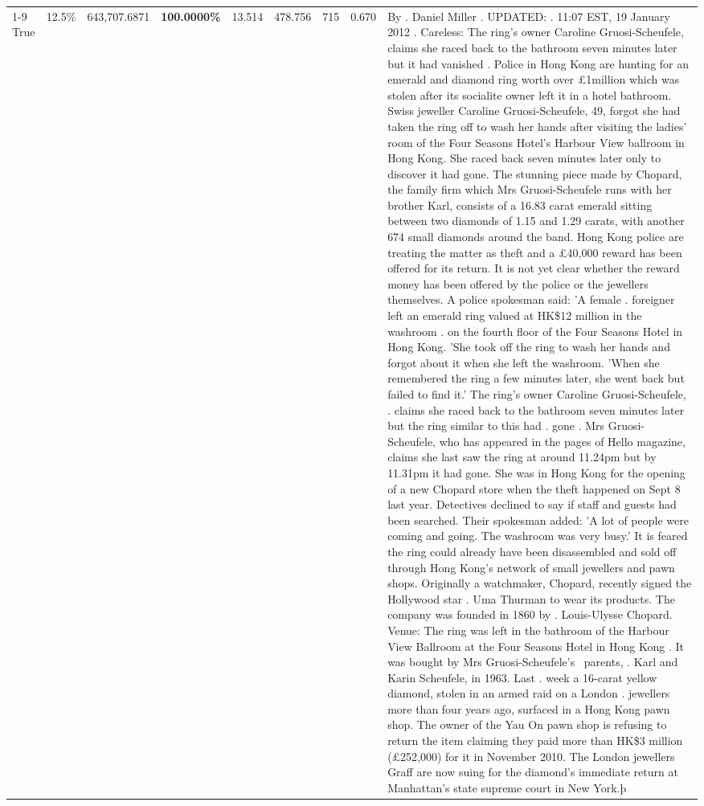 \begin{table}[H]
\begin{tabular}{lllrlllll}
\cline{1-9}
True & 12.5\% & 643,707.6871 & \bfseries \color{red} 100.0000\% & 13.514 & 478.756 & 715 & 0.670 & By . Daniel Miller . UPDATED: . 11:07 EST, 19 January 2012 . Careless: The ring's owner Caroline Gruosi-Scheufele, claims she raced back to the bathroom seven minutes later but it had vanished . Police in Hong Kong are hunting for an emerald and diamond ring worth over £1million which was stolen after its socialite owner left it in a hotel bathroom. Swiss jeweller Caroline Gruosi-Scheufele, 49, forgot she had taken the ring off to wash her hands after visiting the ladies' room of the Four Seasons Hotel's Harbour View ballroom in Hong Kong. She raced back seven minutes later only to discover it had gone. The stunning piece made by Chopard, the family firm which Mrs Gruosi-Scheufele runs with her brother Karl, consists of a 16.83 carat emerald sitting between two diamonds of 1.15 and 1.29 carats, with another 674 small diamonds around the band. Hong Kong police are treating the matter as theft and a £40,000 reward has been offered for its return. It is not yet clear whether the reward money has been offered by the police or the jewellers themselves. A police spokesman said: 'A female . foreigner left an emerald ring valued at HK\$12 million in the washroom . on the fourth floor of the Four Seasons Hotel in Hong Kong. 'She took off the ring to wash her hands and forgot about it when she left the washroom. 'When she remembered the ring a few minutes later, she went back but failed to find it.' The ring's owner Caroline Gruosi-Scheufele, . claims she raced back to the bathroom seven minutes later but the ring similar to this had . gone . Mrs Gruosi-Scheufele, who has appeared in the pages of Hello magazine, claims she last saw the ring at around 11.24pm but by 11.31pm it had gone. She was in Hong Kong for the opening of a new Chopard store when the theft happened on Sept 8 last year. Detectives declined to say if staff and guests had been searched. Their spokesman added: 'A lot of people were coming and going. The washroom was very busy.' It is feared the ring could already have been disassembled and sold off through Hong Kong's network of small jewellers and pawn shops. Originally a watchmaker, Chopard, recently signed the Hollywood star . Uma Thurman to wear its products. The company was founded in 1860 by . Louis-Ulysse Chopard. Venue: The ring was left in the bathroom of the Harbour View Ballroom at the Four Seasons Hotel in Hong Kong . It was bought by Mrs Gruosi-Scheufele's  parents, . Karl and Karin Scheufele, in 1963. Last . week a 16-carat yellow diamond, stolen in an armed raid on a London . jewellers more than four years ago, surfaced in a Hong Kong pawn shop. The owner of the Yau On pawn shop is refusing to return the item claiming they paid more than HK\$3 million (£252,000) for it in November 2010. The London jewellers Graff are now suing for the diamond’s immediate return at Manhattan’s state supreme court in New York.þ \\

\end{tabular}
\end{table}
